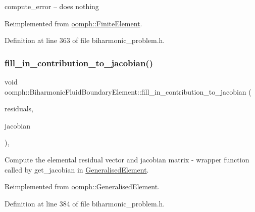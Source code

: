compute\+\_\+error -- does nothing 



Reimplemented from \hyperlink{classoomph_1_1FiniteElement_a73c79a1f1e5b1d334757812a6bbd58ff}{oomph\+::\+Finite\+Element}.



Definition at line 363 of file biharmonic\+\_\+problem.\+h.

\mbox{\label{classoomph_1_1BiharmonicFluidBoundaryElement_a9bc299d6f1c70851999b9e9b72c88602}} 
\subsubsection{\texorpdfstring{fill\+\_\+in\+\_\+contribution\+\_\+to\+\_\+jacobian()}{fill\_in\_contribution\_to\_jacobian()}}
{\footnotesize\ttfamily void oomph\+::\+Biharmonic\+Fluid\+Boundary\+Element\+::fill\+\_\+in\+\_\+contribution\+\_\+to\+\_\+jacobian (\begin{DoxyParamCaption}\item[{\hyperlink{classoomph_1_1Vector}{Vector}$<$ double $>$ \&}]{residuals,  }\item[{\hyperlink{classoomph_1_1DenseMatrix}{Dense\+Matrix}$<$ double $>$ \&}]{jacobian }\end{DoxyParamCaption})\hspace{0.3cm}{\ttfamily [inline]}, {\ttfamily [virtual]}}



Compute the elemental residual vector and jacobian matrix -\/ wrapper function called by get\+\_\+jacobian in \hyperlink{classoomph_1_1GeneralisedElement}{Generalised\+Element}. 



Reimplemented from \hyperlink{classoomph_1_1GeneralisedElement_a6ae09fc0d68e4309ac1b03583d252845}{oomph\+::\+Generalised\+Element}.



Definition at line 384 of file biharmonic\+\_\+problem.\+h.

\mbox{\label{classoomph_1_1BiharmonicFluidBoundaryElement_a448d3143a92e1f67b3c829c02a4f28c3}} 
